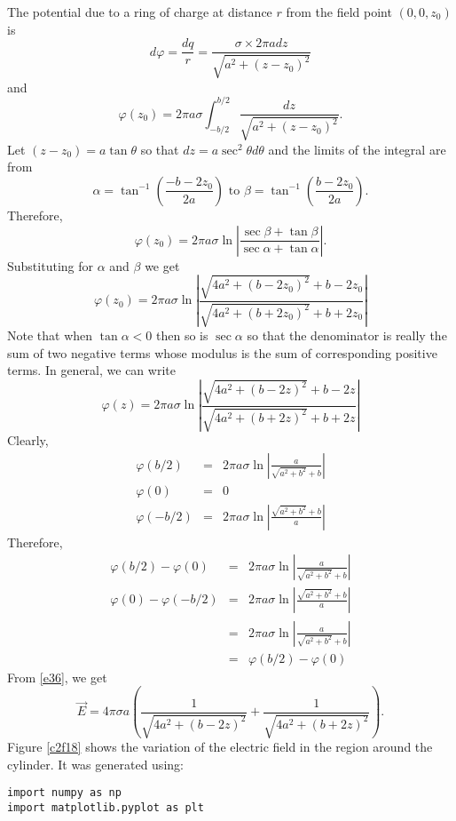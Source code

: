 \documentclass{article}
\begin{document}
\begin{enumerate}
The potential due to a ring of charge at distance $r$ from the field point 
$(0, 0, z_0)$ is
\[
d\varphi = \frac{dq}{r} = \frac{\sigma \times 2\pi adz}{\sqrt{a^2 + (z - z_0)^2}}
\]
and
\[
\varphi(z_0) = 2\pi a\sigma\int_{-b/2}^{b/2}\frac{dz}{\sqrt{a^2 + (z - z_0)^2}}.
\]
Let $(z - z_0) = a\tan\theta$ so that $dz = a\sec^2\theta d\theta$ and the limits
of the integral are from
\[
\alpha = \tan^{-1}\left(\frac{-b-2z_0}{2a}\right)  \text{ to } 
\beta = \tan^{-1}\left(\frac{b - 2z_0}{2a}\right).
\]
Therefore,
\[
\varphi(z_0) = 2\pi a\sigma\ln\left|\frac{\sec\beta + \tan\beta}{\sec\alpha + \tan\alpha}\right|.
\]
Substituting for $\alpha$ and $\beta$ we get
\[
\varphi(z_0) = 2\pi a\sigma\ln\left|\frac{\sqrt{4a^2 + (b - 2z_0)^2} + b - 2z_0}{\sqrt{4a^2 + (b + 2z_0)^2} + b + 2z_0}\right|
\]
Note that when $\tan\alpha < 0$ then so is $\sec\alpha$ so that the denominator 
is really the sum of two negative terms whose modulus is the sum of corresponding
positive terms. In general, we can write
\begin{equation}\label{e36}
\varphi(z) = 2\pi a\sigma\ln\left|\frac{\sqrt{4a^2 + (b - 2z)^2} + b - 2z}{\sqrt{4a^2 + (b + 2z)^2} + b + 2z}\right|
\end{equation}
Clearly,
\begin{eqnarray*}
\varphi(b/2) &=& 2\pi a\sigma\ln\left|\frac{a}{\sqrt{a^2+b^2} + b}\right| \\
\varphi(0) &=& 0 \\
\varphi(-b/2) &=& 2\pi a\sigma\ln\left|\frac{\sqrt{a^2+b^2} + b}{a}\right|
\end{eqnarray*}
Therefore,
\begin{eqnarray*}
\varphi(b/2) - \varphi(0) &=& 2\pi a\sigma\ln\left|\frac{a}{\sqrt{a^2+b^2} + b}\right| \\
\varphi(0) - \varphi(-b/2) &=& 2\pi a\sigma\ln\left|\frac{\sqrt{a^2+b^2} + b}{a}\right| \\
 &=& 2\pi a\sigma\ln\left|\frac{a}{\sqrt{a^2+b^2} + b}\right| \\
 &=& \varphi(b/2) - \varphi(0)
\end{eqnarray*}
From \eqref{e36}, we get
\begin{equation}\label{e37}
\vec{E} = 4\pi\sigma a\left(\frac{1}{\sqrt{4a^2 + (b - 2z)^2}} + \frac{1}{\sqrt{4a^2 + (b + 2z)^2}}\right).
\end{equation}
Figure \ref{c2f18} shows the variation of the electric field in the region around
the cylinder. It was generated using:
\begin{verbatim}
import numpy as np
import matplotlib.pyplot as plt


\end{verbatim}
\end{enumerate}
\end{document}
